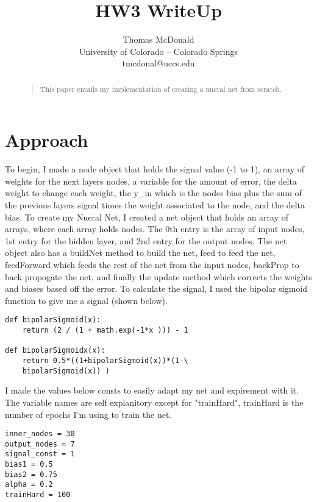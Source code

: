 \documentclass[letterpaper]{article}
\begin{document}
%
\title{HW3 WriteUp}
\author{ Thomas McDonald\\
University of Colorado – Colorado Springs\\
tmcdonal@uccs.edu\\
}
\maketitle
\begin{abstract}
\begin{quote}
This paper entails my implementation of creating a nueral net from scratch.  
\end{quote}
\end{abstract}

\section{Approach}
To begin, I made a node object that holds the signal value (-1 to 1), an array of weights for the next layers nodes, a variable for the amount of error, the delta weight to change each weight, the y\_in which is the nodes bias plus the sum of the previous layers signal times the weight associated to the node, and the delta bias. To create my Nueral Net, I created a net object that holds an array of arrays, where each array holds nodes. The 0th entry is the array of input nodes, 1st entry for the hidden layer, and 2nd entry for the output nodes. The net object also has a buildNet method to build the net, feed to feed the net, feedForward which feeds the rest of the net from the input nodes, backProp to back propogate the net, and finally the update method which corrects the weights and biases based off the error. To calculate the signal, I used the bipolar sigmoid function to give me a signal (shown below).
\begin{lstlisting}
def bipolarSigmoid(x):
    return (2 / (1 + math.exp(-1*x ))) - 1

def bipolarSigmoidx(x):
    return 0.5*((1+bipolarSigmoid(x))*(1-\
	bipolarSigmoid(x)) )
\end{lstlisting}
I made the values below consts to easily adapt my net and expirement with it. The variable names are self explanitory except for "trainHard", trainHard is the number of epochs I'm using to train the net.
\begin{lstlisting}
inner_nodes = 30
output_nodes = 7
signal_const = 1
bias1 = 0.5
bias2 = 0.75
alpha = 0.2
trainHard = 100
\end{lstlisting}
\end{document}
